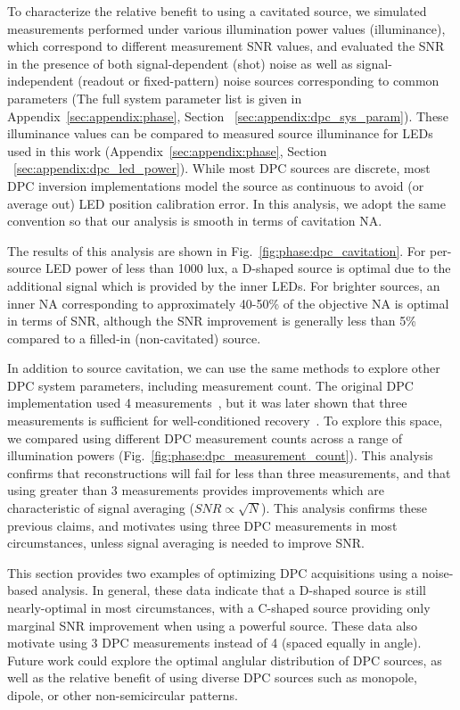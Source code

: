 To characterize the relative benefit to using a cavitated source, we simulated measurements performed under various illumination power values (illuminance), which correspond to different measurement SNR values, and evaluated the SNR in the presence of both signal-dependent (shot) noise as well as signal-independent (readout or fixed-pattern) noise sources corresponding to common parameters (The full system parameter list is given in Appendix~\ref{sec:appendix:phase}, Section ~\ref{sec:appendix:dpc_sys_param}). These illuminance values can be compared to measured source illuminance for LEDs used in this work (Appendix~\ref{sec:appendix:phase}, Section ~\ref{sec:appendix:dpc_led_power}). While most DPC sources are discrete, most DPC inversion implementations model the source as continuous to avoid (or average out) LED position calibration error. In this analysis, we adopt the same convention so that our analysis is smooth in terms of cavitation NA.

The results of this analysis are shown in Fig.~\ref{fig:phase:dpc_cavitation}. For per-source LED power of less than 1000 lux, a D-shaped source is optimal due to the additional signal which is provided by the inner LEDs. For brighter sources, an inner NA corresponding to approximately 40-50\% of the objective NA is optimal in terms of SNR, although the SNR improvement is generally less than 5\% compared to a filled-in (non-cavitated) source.

In addition to source cavitation, we can use the same methods to explore other DPC system parameters, including measurement count. The original DPC implementation used 4 measurements~\cite{tian2015quantitative}, but it was later shown that three measurements is sufficient for well-conditioned recovery~\cite{PhillipsChen17cDPC}. To explore this space, we compared using different DPC measurement counts across a range of illumination powers (Fig.~\ref{fig:phase:dpc_measurement_count}). This analysis confirms that reconstructions will fail for less than three measurements, and that using greater than 3 measurements provides improvements which are characteristic of signal averaging ($SNR \propto \sqrt{N}$). This analysis confirms these previous claims, and motivates using three DPC measurements in most circumstances, unless signal averaging is needed to improve SNR.

This section provides two examples of optimizing DPC acquisitions using a noise-based analysis. In general, these data indicate that a D-shaped source is still nearly-optimal in most circumstances, with a C-shaped source providing only marginal SNR improvement when using a powerful source. These data also motivate using 3 DPC measurements instead of 4 (spaced equally in angle). Future work could explore the optimal anglular distribution of DPC sources, as well as the relative benefit of using diverse DPC sources such as monopole, dipole, or other non-semicircular patterns.


